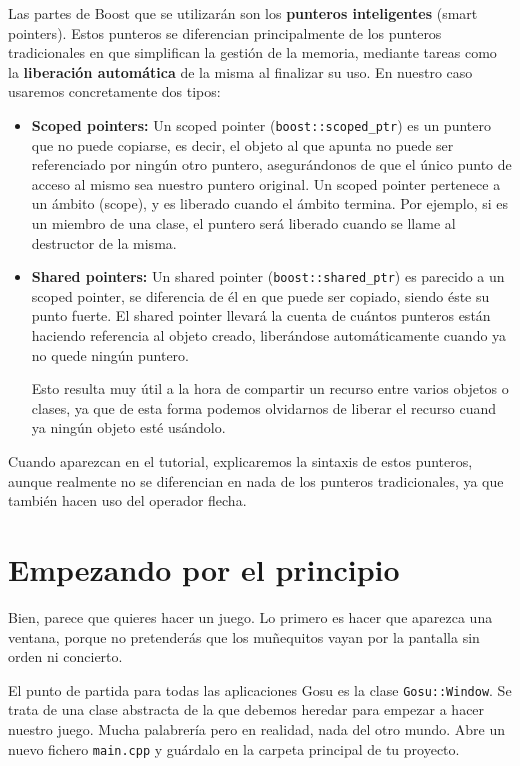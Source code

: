 \documentclass{article}
\begin{document}
Las partes de Boost que se utilizarán son los \textbf{punteros
  inteligentes} (smart pointers). Estos punteros se diferencian
principalmente de los punteros tradicionales en que simplifican la
gestión de la memoria, mediante tareas como la \textbf{liberación
  automática} de la misma al finalizar su uso. En nuestro caso
usaremos concretamente dos tipos:
\begin{itemize}
\item \textbf{Scoped pointers:} Un scoped pointer
  (\texttt{boost::scoped\_ptr}) es un puntero que no puede copiarse, es
  decir, el objeto al que apunta no puede ser referenciado por ningún
  otro puntero, asegurándonos de que el único punto de acceso al mismo
  sea nuestro puntero original. Un scoped pointer pertenece a un
  ámbito (scope), y es liberado cuando el ámbito termina. Por ejemplo,
  si es un miembro de una clase, el puntero será liberado cuando se
  llame al destructor de la misma.
\item \textbf{Shared pointers:} Un shared pointer
  (\texttt{boost::shared\_ptr}) es parecido a un scoped pointer, se
  diferencia de él en que puede ser copiado, siendo éste su punto
  fuerte. El shared pointer llevará la cuenta de cuántos punteros
  están haciendo referencia al objeto creado, liberándose
  automáticamente cuando ya no quede ningún puntero. 

  Esto resulta muy útil a la hora de compartir un recurso entre varios
  objetos o clases, ya que de esta forma podemos olvidarnos de liberar
  el recurso cuand ya ningún objeto esté usándolo.
\end{itemize}

Cuando aparezcan en el tutorial, explicaremos la sintaxis de estos
punteros, aunque realmente no se diferencian en nada de los punteros
tradicionales, ya que también hacen uso del operador flecha.

\section{Empezando por el principio}

Bien, parece que quieres hacer un juego. Lo primero es hacer que
aparezca una ventana, porque no pretenderás que los muñequitos vayan
por la pantalla sin orden ni concierto.

El punto de partida para todas las aplicaciones Gosu es la clase
\texttt{Gosu::Window}. Se trata de una clase abstracta de la que
debemos heredar para empezar a hacer nuestro juego. Mucha palabrería
pero en realidad, nada del otro mundo. Abre un nuevo fichero
\texttt{main.cpp} y guárdalo en la carpeta principal de tu proyecto.

\end{document}

